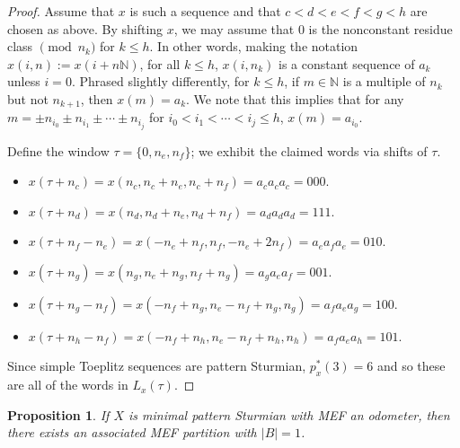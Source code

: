 \documentclass[11pt,reqno]{amsart}
\newtheorem{proposition}[theorem]{Proposition}
\theoremstyle{definition}
\theoremstyle{plain}
\newcommand{\AuthornoteA}[2]{{\sf\small\color{magenta}{[#1: #2]}}}
\newcommand{\AuthornoteR}[2]{{\sf\small\color{blue}{[#1: #2]}}}
\newcommand{\Anote}{\AuthornoteA{A}}
\newcommand{\rp}{\AuthornoteR{R}}
\begin{document}
\begin{proof}
Assume that $x$ is such a sequence and that $c < d < e < f < g < h$ are chosen as above. 
By shifting $x$, we may assume that $0$ is the nonconstant residue class $\pmod{n_k}$ for $k \leq h$. In other words, making the notation $x(i, n) := x(i + n \mathbb{N})$, for all $k \leq h$, $x(i, n_k)$ is a constant sequence of $a_k$ unless $i = 0$. Phrased slightly differently, for $k \leq h$, if $m \in \mathbb{N}$ is a multiple of $n_k$ but not 
$n_{k+1}$, then $x(m) = a_k$. We note that this implies that for any $m = \pm n_{i_0} \pm n_{i_1} \pm \cdots \pm n_{i_j}$ for 
$i_0 < i_1 < \cdots < i_j \leq h$, $x(m) = a_{i_0}$.
 
Define the window $\tau = \{0, n_e, n_f\}$; we exhibit the claimed words via shifts of $\tau$.

\begin{itemize}
\item $x(\tau + n_c) = x(n_c, n_c + n_e, n_c + n_f) = a_c a_c a_c = 000$.
\item $x(\tau + n_d) = x(n_d, n_d + n_e, n_d + n_f) = a_d a_d a_d = 111$.
\item $x(\tau + n_f - n_e) = x(-n_e + n_f, n_f, -n_e + 2n_f) = a_e a_f a_e = 010$.
\item $x(\tau + n_g) = x(n_g, n_e + n_g, n_f + n_g) = a_g a_e a_f = 001$.
\item $x(\tau + n_g - n_f) = x(-n_f + n_g, n_e - n_f + n_g, n_g) = a_f a_e a_g = 100$.
\item $x(\tau + n_h - n_f) = x(-n_f + n_h, n_e - n_f + n_h, n_h) = a_f a_e a_h = 101$.
\end{itemize}

Since simple Toeplitz sequences are pattern Sturmian, $p^*_x(3) = 6$ and so these are all of the words in $L_x(\tau)$.
\end{proof}

\begin{proposition}\label{b1}
If $X$ is minimal pattern Sturmian with MEF an odometer, then there exists an associated MEF partition with $|B| = 1$.
\end{proposition}

\end{document}
